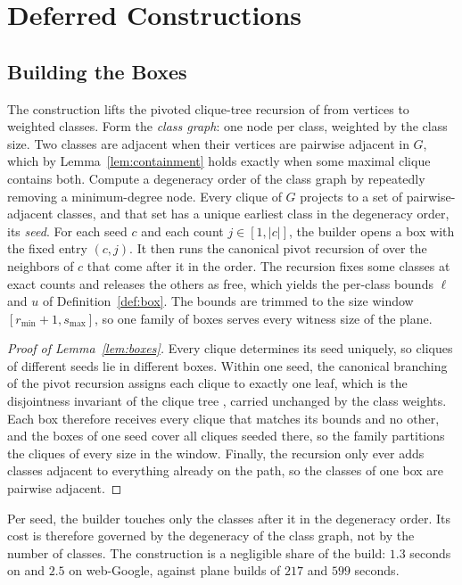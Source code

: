 \appendix
\section{Deferred Constructions}\label{app:deferred}

\subsection{Building the Boxes}\label{app:boxes}
The construction lifts the pivoted clique-tree recursion of \cite{Pivoter} from vertices to weighted classes.
%
Form the \emph{class graph}: one node per class, weighted by the class size.
%
Two classes are adjacent when their vertices are pairwise adjacent in $G$, which by Lemma~\ref{lem:containment} holds exactly when some maximal clique contains both.
%
Compute a degeneracy order of the class graph by repeatedly removing a minimum-degree node.
%
Every clique of $G$ projects to a set of pairwise-adjacent classes, and that set has a unique earliest class in the degeneracy order, its \emph{seed}.
%
For each seed $c$ and each count $j\in[1,|c|]$, the builder opens a box with the fixed entry $(c,j)$.
%
It then runs the canonical pivot recursion of \cite{Pivoter} over the neighbors of $c$ that come after it in the order.
%
The recursion fixes some classes at exact counts and releases the others as free, which yields the per-class bounds $\ell$ and $u$ of Definition~\ref{def:box}.
%
The bounds are trimmed to the size window $[r_{\min}{+}1, s_{\max}]$, so one family of boxes serves every witness size of the plane.

\begin{proof}[Proof of Lemma~\ref{lem:boxes}]
Every clique determines its seed uniquely, so cliques of different seeds lie in different boxes.
%
Within one seed, the canonical branching of the pivot recursion assigns each clique to exactly one leaf, which is the disjointness invariant of the clique tree \cite{Pivoter}, carried unchanged by the class weights.
%
Each box therefore receives every clique that matches its bounds and no other, and the boxes of one seed cover all cliques seeded there, so the family partitions the cliques of every size in the window.
%
Finally, the recursion only ever adds classes adjacent to everything already on the path, so the classes of one box are pairwise adjacent.
\end{proof}

Per seed, the builder touches only the classes after it in the degeneracy order.
%
Its cost is therefore governed by the degeneracy of the class graph, not by the number of classes.
%
The construction is a negligible share of the build: $1.3$ seconds on \pkustk{} and $2.5$ on \textsf{web-Google}, against plane builds of $217$ and $599$ seconds.

